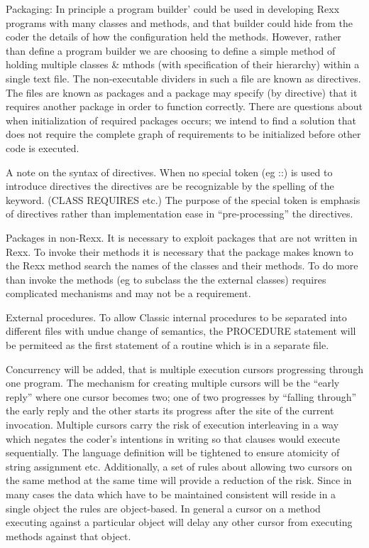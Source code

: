 Packaging: In principle a program builder' could be used in developing
Rexx programs with many classes and methods, and that builder could hide
from the coder the details of how the configuration held the methods.
However, rather than define a program builder we are choosing to define
a simple method of holding multiple classes \& mthods (with
specification of their hierarchy) within a single text file. The
non-executable dividers in such a file are known as directives. The
files are known as packages and a package may specify (by directive)
that it requires another package in order to function correctly. There
are questions about when initialization of required packages occurs; we
intend to find a solution that does not require the complete graph of
requirements to be initialized before other code is executed.

A note on the syntax of directives. When no special token (eg ::) is
used to introduce directives the directives are be recognizable by the
spelling of the keyword. (CLASS REQUIRES etc.) The purpose of the
special token is emphasis of directives rather than implementation ease
in ``pre-processing'' the directives.

Packages in non-Rexx. It is necessary to exploit packages that are not
written in Rexx. To invoke their methods it is necessary that the
package makes known to the Rexx method search the names of the classes
and their methods. To do more than invoke the methods (eg to subclass
the the external classes) requires complicated mechanisms and may not be
a requirement.

External procedures. To allow Classic internal procedures to be
separated into different files with undue change of semantics, the
PROCEDURE statement will be permiteed as the first statement of a
routine which is in a separate file.

Concurrency will be added, that is multiple execution cursors
progressing through one program. The mechanism for creating multiple
cursors will be the ``early reply'' where one cursor becomes two; one of
two progresses by ``falling through'' the early reply and the other
starts its progress after the site of the current invocation. Multiple
cursors carry the risk of execution interleaving in a way which negates
the coder's intentions in writing so that clauses would execute
sequentially. The language definition will be tightened to ensure
atomicity of string assignment etc. Additionally, a set of rules about
allowing two cursors on the same method at the same time will provide a
reduction of the risk. Since in many cases the data which have to be
maintained consistent will reside in a single object the rules are
object-based. In general a cursor on a method executing against a
particular object will delay any other cursor from executing methods
against that object.

